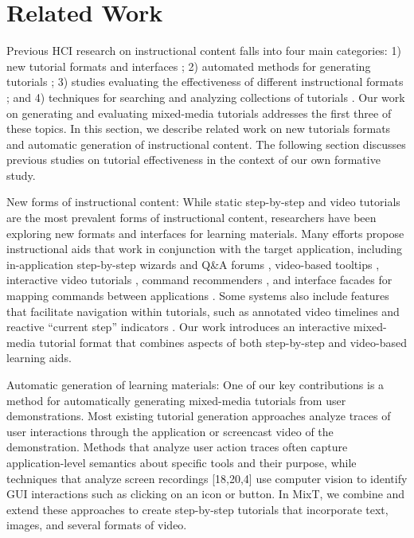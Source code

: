 \section{Related Work}

Previous HCI research on instructional content falls into four main categories:
%
1) new tutorial formats and interfaces \cite{Bergman:2005:DocWizards,Fernquist:2011:SRE:2047196.2047245,Grossman:2010wr,Kelleher:2005:STD:1054972.1055047,Matejka:2009:CCR:1622176.1622214,Matejka:2011:IIQ:2047196.2047218,Pongnumkul:2011ju};
%
2) automated methods for generating tutorials \cite{Denning:2011fy,Grabler:2009jj,Grossman:2010jz,Pongnumkul:2011ju};
%
3) studies evaluating the effectiveness of different instructional formats \cite{Grabler:2009jj,Grossman:2010wr,Harrison:1995uh,Palmiter:1991:ADV:107792.107797,Palmiter:1993:ADL:1461829.1461830};
%
and 4) techniques for searching and analyzing collections of tutorials \cite{Ekstrand:2011:SSL:2047196.2047220,Kong:2012:DTR:2207676.2208549}. Our work on generating and evaluating mixed-media tutorials addresses the first three of these topics. In this section, we describe related work on new tutorials formats and automatic generation of instructional content. The following section discusses previous studies on tutorial effectiveness in the context of our own formative study.

New forms of instructional content: While static step-by-step and video tutorials are the most prevalent forms of instructional content, researchers have been exploring new formats and interfaces for learning materials. Many efforts propose instructional aids that work in conjunction with the target application, including in-application step-by-step wizards \cite{Bergman:2005:DocWizards,Kelleher:2005:STD:1054972.1055047,Fernquist:2011:SRE:2047196.2047245} and Q\&A forums \cite{Matejka:2011:IIQ:2047196.2047218}, video-based tooltips \cite{Grossman:2010wr}, interactive video tutorials \cite{Pongnumkul:2011ju}, command recommenders \cite{Matejka:2009:CCR:1622176.1622214}, and interface facades for mapping commands between applications \cite{Ramesh:2011:STU:2047196.2047212}. Some systems also include features that facilitate navigation within tutorials, such as annotated video timelines \cite{Grossman:2010jz,Pongnumkul:2011ju} and reactive ``current step'' indicators \cite{Fernquist:2011:SRE:2047196.2047245}. Our work introduces an interactive mixed-media tutorial format that combines aspects of both step-by-step and video-based learning aids.

Automatic generation of learning materials: One of our key contributions is a method for automatically generating mixed-media tutorials from user demonstrations. Most existing tutorial generation approaches analyze traces of user interactions through the application or screencast video of the demonstration. Methods that analyze user action traces \cite{Grabler:2009jj,Denning:2011fy,Grossman:2010jz} often capture application-level semantics about specific tools and their purpose, while techniques that analyze screen recordings [18,20,4] use computer vision to identify GUI interactions such as clicking on an icon or button. In MixT, we combine and extend these approaches to create step-by-step tutorials that incorporate text, images, and several formats of video.
